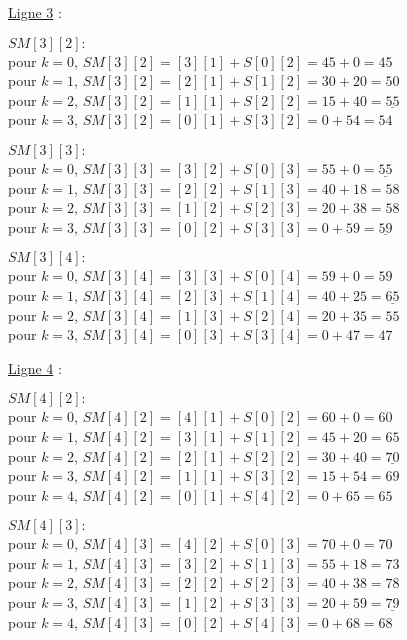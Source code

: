 \documentclass[11pt]{article}
\begin{document}
\begin{enumerate}[label=\Roman*.]
 \underline{Ligne 3} : 
 
 \smallskip

 $SM[3][2]:$\\
pour $k=0$, $SM[3][2]= [3][1] + S[0][2] = 45+0 = 45$ \\
pour $k=1$, $SM[3][2]= [2][1] + S[1][2] = 30+ 20 = 50$ \\
pour $k=2$, $SM[3][2]= [1][1] + S[2][2] = 15+ 40 = \underline{55}$ \\
pour $k=3$, $SM[3][2]= [0][1] + S[3][2] = 0+ 54 = 54$ \\
\smallskip

$SM[3][3]:$\\
pour $k=0$, $SM[3][3]= [3][2] + S[0][3] = 55 +0 = \underline{55}$ \\
pour $k=1$, $SM[3][3]= [2][2] + S[1][3] = 40+ 18 = 58$ \\
pour $k=2$, $SM[3][3]= [1][2] + S[2][3] = 20+ 38 = 58$ \\
pour $k=3$, $SM[3][3]= [0][2] + S[3][3] = 0+ 59 = \underline{59}$ \\
\smallskip

$SM[3][4]:$\\
pour $k=0$, $SM[3][4]= [3][3] + S[0][4] = 59+0 = 59$ \\
pour $k=1$, $SM[3][4]= [2][3] + S[1][4] = 40+ 25 = \underline{65}$ \\
pour $k=2$, $SM[3][4]= [1][3] + S[2][4] = 20+ 35 = 55$ \\
pour $k=3$, $SM[3][4]= [0][3] + S[3][4] = 0+ 47 = 47$ \\
\smallskip

 \underline{Ligne 4} : 
 
 \smallskip

 $SM[4][2]:$\\
pour $k=0$, $SM[4][2]= [4][1] + S[0][2] = 60+0 = 60$ \\
pour $k=1$, $SM[4][2]= [3][1] + S[1][2] = 45+ 20 = 65$ \\
pour $k=2$, $SM[4][2]= [2][1] + S[2][2] = 30+ 40 = \underline{70}$ \\
pour $k=3$, $SM[4][2]= [1][1] + S[3][2] = 15+ 54 = 69$ \\
pour $k=4$, $SM[4][2]= [0][1] + S[4][2] = 0+ 65 = 65$ \\
\smallskip

$SM[4][3]:$\\
pour $k=0$, $SM[4][3]= [4][2] + S[0][3] = 70 +0 = 70$ \\
pour $k=1$, $SM[4][3]= [3][2] + S[1][3] = 55+ 18 = 73$ \\
pour $k=2$, $SM[4][3]= [2][2] + S[2][3] = 40+ 38 = 78$ \\
pour $k=3$, $SM[4][3]= [1][2] + S[3][3] = 20+ 59 = \underline{79}$ \\
pour $k=4$, $SM[4][3]= [0][2] + S[4][3] = 0+ 68 = 68$ \\
\smallskip


\end{enumerate}
\end{document}
